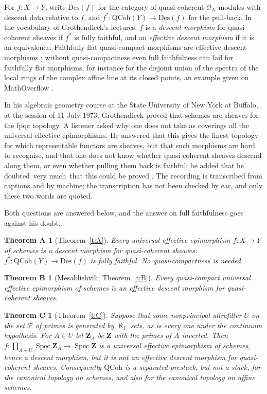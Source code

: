 \documentclass[11pt,a4paper]{amsart}
\newtheorem*{theoremA}{Theorem A}
\newtheorem*{theoremB}{Theorem B}
\newtheorem*{theoremC}{Theorem C}
\theoremstyle{definition}
\theoremstyle{remark}
\newcommand{\q}[1]{\guillemotleft\,#1\,\guillemotright}
\newcommand{\Z}{\mathbf Z}
\newcommand{\Pp}{\mathcal P}
\newcommand{\QCoh}{\mathrm{QCoh}}
\newcommand{\Des}{\mathrm{Des}}
\newcommand{\Spec}{\operatorname{Spec}}
\begin{document}
For $f\colon X\to Y$, write $\Des(f)$ for the category of quasi-coherent $\mathcal O_X$-modules with descent data relative to $f$, and $f^*\colon\QCoh(Y)\to\Des(f)$ for the pull-back. In the vocabulary of Grothendieck's lectures, $f$ is a \emph{descent morphism} for quasi-coherent sheaves if $f^*$ is fully faithful, and an \emph{effective descent morphism} if it is an equivalence. Faithfully flat quasi-compact morphisms are effective descent morphisms \cite[023T]{stacks}; without quasi-compactness even full faithfulness can fail for faithfully flat morphisms, for instance for the disjoint union of the spectra of the local rings of the complex affine line at its closed points, an example given on MathOverflow \cite{mo127362}.

In his algebraic geometry course at the State University of New York at Buffalo, at the session of 11 July 1973, Grothendieck proved that schemes are sheaves for the fpqc topology. A listener asked why one does not take as coverings all the universal effective epimorphisms. He answered that this gives the finest topology for which representable functors are sheaves, but that such morphisms are hard to recognise, and that one does not know whether quasi-coherent sheaves descend along them, or even whether pulling them back is faithful; he added that he doubted \q{very much} that this could be proved \cite[6:26:20--6:27:24]{buffalo}. The recording is transcribed from captions and by machine; the transcription has not been checked by ear, and only these two words are quoted.

Both questions are answered below, and the answer on full faithfulness goes against his doubt.

\begin{theoremA}[Theorem~\ref{t:A}]
Every universal effective epimorphism $f\colon X\to Y$ of schemes is a descent morphism for quasi-coherent sheaves: $f^*\colon\QCoh(Y)\to\Des(f)$ is fully faithful. No quasi-compactness is needed.
\end{theoremA}

\begin{theoremB}[Mesablishvili; Theorem~\ref{t:B}]
Every quasi-compact universal effective epimorphism of schemes is an effective descent morphism for quasi-coherent sheaves.
\end{theoremB}

\begin{theoremC}[Theorem~\ref{t:C}]
Suppose that some nonprincipal ultrafilter $U$ on the set $\Pp$ of primes is generated by $\aleph_1$ sets, as is every one under the continuum hypothesis. For $A\in U$ let $\Z_A$ be $\Z$ with the primes of $A$ inverted. Then $f\colon\coprod_{A\in U}\Spec\Z_A\to\Spec\Z$ is a universal effective epimorphism of schemes, hence a descent morphism, but it is not an effective descent morphism for quasi-coherent sheaves. Consequently $\QCoh$ is a separated prestack, but not a stack, for the canonical topology on schemes, and also for the canonical topology on affine schemes.
\end{theoremC}
\end{document}
